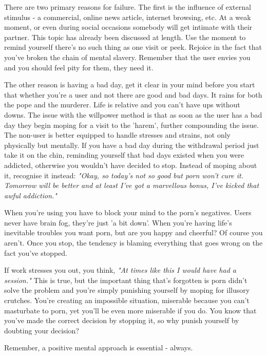 \documentclass[easypeasy.tex]{subfiles}
\begin{document}
There are two primary reasons for failure. The first is the influence of external stimulus - a commercial, online news article, internet browsing, etc. At a weak moment, or even during social occasions somebody will get intimate with their partner. This topic has already been discussed at length. Use the moment to remind yourself there's no such thing as one visit or peek. Rejoice in the fact that you've broken the chain of mental slavery. Remember that the user envies you and you should feel pity for them, they need it.

The other reason is having a bad day, get it clear in your mind before you start that whether you're a user and not there are good and bad days. It rains for both the pope and the murderer. Life is relative and you can't have ups without downs. The issue with the willpower method is that as soon as the user has a bad day they begin moping for a visit to the 'harem', further compounding the issue. The non-user is better equipped to handle stresses and strains, not only physically but mentally. If you have a bad day during the withdrawal period just take it on the chin, reminding yourself that bad days existed when you were addicted, otherwise you wouldn't have decided to stop. Instead of moping about it, recognise it instead: \textit{"Okay, so today's not so good but porn won't cure it. Tomorrow will be better and at least I've got a marvellous bonus, I've kicked that awful addiction."}

When you're using you have to block your mind to the porn's negatives. Users never have brain fog, they're just 'a bit down'. When you're having life's inevitable troubles you want porn, but are you happy and cheerful? Of course you aren't. Once you stop, the tendency is blaming everything that goes wrong on the fact you've stopped.

If work stresses you out, you think, \textit{"At times like this I would have had a session."} This is true, but the important thing that's forgotten is porn didn't solve the problem and you're simply punishing yourself by moping for illusory crutches. You're creating an impossible situation, miserable because you can't masturbate to porn, yet you'll be even more miserable if you do. You know that you've made the correct decision by stopping it, so why punish yourself by doubting your decision?

{\Large Remember, a positive mental approach is essential - always.}
\end{document}
